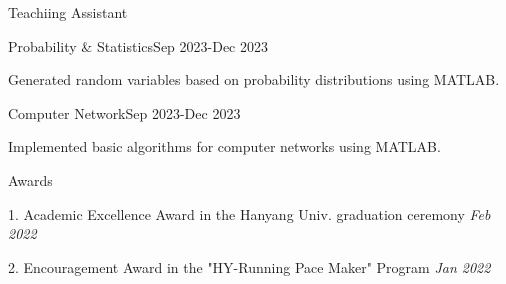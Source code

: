 \documentclass[
	11pt, %
]{resume} %
\begin{document}
\begin{rSection}{Teachiing Assistant}

	\begin{rSubsection}{Probability \& Statistics}{Sep 2023-Dec 2023}{}{}
		\item Generated random variables based on probability distributions using MATLAB.
	\end{rSubsection}

	\begin{rSubsection}{Computer Network}{Sep 2023-Dec 2023}{}{}
		\item Implemented basic algorithms for computer networks using MATLAB.
	\end{rSubsection}

\end{rSection}

\begin{rSection}{Awards}

	1. Academic Excellence Award in the Hanyang Univ. graduation ceremony \hfill \textit {Feb 2022}

	2. Encouragement Award in the "HY-Running Pace Maker" Program \hfill \textit {Jan 2022}

\end{rSection}

\end{document}
